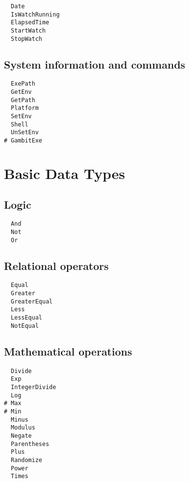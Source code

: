 \begin{multicols}{3}
\begin{verbatim}
  Date 
  IsWatchRunning 
  ElapsedTime 
  StartWatch 
  StopWatch 
\end{verbatim}
\end{multicols}

\subsection{System information and commands}

\begin{multicols}{3}
\begin{verbatim}
  ExePath 
  GetEnv 
  GetPath 
  Platform 
  SetEnv 
  Shell 
  UnSetEnv 
# GambitExe 
\end{verbatim}
\end{multicols}

\section{Basic Data Types}

\subsection{Logic}

\begin{multicols}{3}
\begin{verbatim}
  And 
  Not 
  Or 
\end{verbatim}
\end{multicols}

\subsection{Relational operators}

\begin{multicols}{3}
\begin{verbatim}
  Equal 
  Greater 
  GreaterEqual 
  Less 
  LessEqual 
  NotEqual 
\end{verbatim}
\end{multicols}

\subsection{Mathematical operations}

\begin{multicols}{3}
\begin{verbatim}
  Divide 
  Exp 
  IntegerDivide 
  Log 
# Max
# Min
  Minus 
  Modulus 
  Negate 
  Parentheses 
  Plus 
  Randomize 
  Power 
  Times 
\end{verbatim}
\end{multicols}


